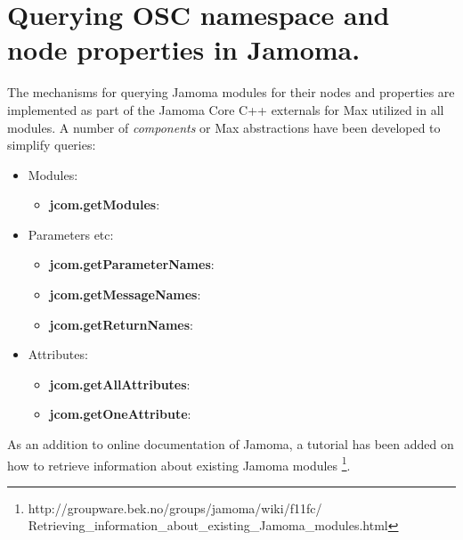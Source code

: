 \documentclass{article}
\begin{document}
%

\section{Querying OSC namespace and node properties in Jamoma.}  
 
The mechanisms for querying Jamoma modules for their nodes and properties are implemented as part of the Jamoma Core C++ externals for Max utilized in all modules. A number of \emph{components} or Max abstractions have been developed to simplify queries:

\begin{itemize}
	
	\item Modules:
	
	\begin{itemize}
		
		\item \textbf{jcom.getModules}: 

	\end{itemize}
	
	\item Parameters etc:
	
	\begin{itemize}

		\item \textbf{jcom.getParameterNames}:
	
		\item \textbf{jcom.getMessageNames}:
	
		\item \textbf{jcom.getReturnNames}:
		
	\end{itemize}
	
	\item Attributes:
	
	\begin{itemize}

		\item \textbf{jcom.getAllAttributes}:
	
		\item \textbf{jcom.getOneAttribute}:
		
		\end{itemize}
		
\end{itemize}


As an addition to online documentation of Jamoma, a tutorial has been added on how to retrieve information about existing Jamoma modules \footnote{http://groupware.bek.no/groups/jamoma/wiki/f11fc/ \\ Retrieving\_information\_about\_existing\_Jamoma\_modules.html}.
\end{document}
